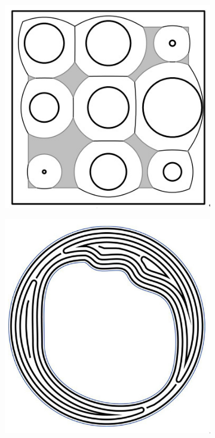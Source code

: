 \begin{figure}
\begin{subfigure}{0.45\columnwidth}
\includegraphics[width=\columnwidth]{sources/related_work/moessen.jpg}
\caption{\citeauthor{Moesen2011}}
\label{moessen}
\end{subfigure}
\begin{subfigure}{0.45\columnwidth}
\includegraphics[width=\columnwidth]{sources/related_work/jin.jpg}
\caption{\citeauthor{Jin2017}}
\label{jin}
\end{subfigure}
\end{figure}

